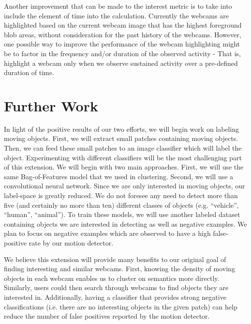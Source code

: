 \documentclass{article}
\begin{document}
Another improvement that can be made to the interest metric is to take into
include the element of time into the calculation. Currently the webcams are
highlighted based on the current webcam image that has the highest foreground
blob areas, without consideration for the past history of the webcams. However,
one possible way to improve the performance of the webcam highlighting might be
to factor in the frequency and/or duration of the observed activity - That is,
highlight a webcam only when we observe sustained activity over a pre-defined
duration of time. 

\section{Further Work}
In light of the positive results of our two efforts, we will begin work on
labeling moving objects. First, we will extract small patches containing moving
objects. Then, we can feed these small patches to an image classifier which
will label the object. Experimenting with different classifiers will be the
most challenging part of this extension.  We will begin with two main
approaches.  First, we will use the same Bag-of-Features model that we used in
clustering.  Second, we will use a convolutional neural network. Since we are
only interested in moving objects, our label-space is greatly reduced. We do
not foresee any need to detect more than five (and certainly no more than ten)
different classes of objects (e.g. ``vehicle'', ``human'', ``animal''). To
train these models, we will use another labeled dataset containing objects we
are interested in detecting as well as negative examples. We plan to focus on
negative examples which are observed to have a high false-positive rate by our
motion detector.


We believe this extension will provide many benefits to our original goal of
finding interesting and similar webcams. First, knowing the density of moving
objects in each webcam enables us to cluster on semantics more directly.
Similarly, users could then search through webcams to find objects they are
interested in. Additionally, having a classifier that provides strong negative
classifications (i.e. there are no interesting objects in the given patch) can
help reduce the number of false positives reported by the motion detector.

\newpage
\end{document}
